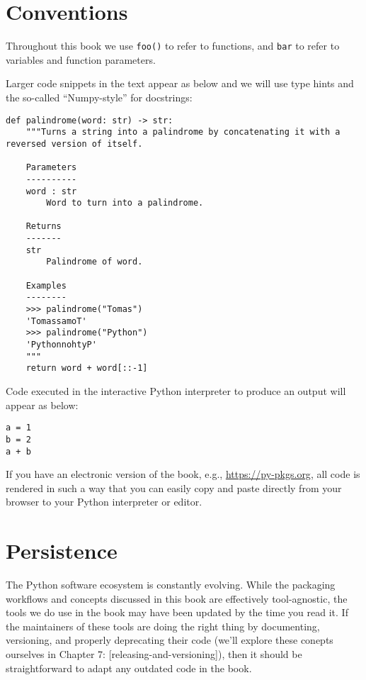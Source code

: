 \documentclass[
]{krantz}
\begin{document}
\hypertarget{conventions}{%
\section*{Conventions}\label{conventions}}


Throughout this book we use \texttt{foo()} to refer to functions, and \texttt{bar} to refer to variables and function parameters.

Larger code snippets in the text appear as below and we will use type hints and the so-called ``Numpy-style'' for docstrings:

\begin{verbatim}
def palindrome(word: str) -> str:
    """Turns a string into a palindrome by concatenating it with a reversed version of itself.
    
    Parameters
    ----------
    word : str
        Word to turn into a palindrome.
    
    Returns
    -------
    str
        Palindrome of word.
    
    Examples
    --------
    >>> palindrome("Tomas")
    'TomassamoT'
    >>> palindrome("Python")
    'PythonnohtyP'
    """
    return word + word[::-1]
\end{verbatim}

Code executed in the interactive Python interpreter to produce an output will appear as below:

\begin{verbatim}
a = 1
b = 2
a + b
\end{verbatim}

If you have an electronic version of the book, e.g., \url{https://py-pkgs.org}, all code is rendered in such a way that you can easily copy and paste directly from your browser to your Python interpreter or editor.

\hypertarget{persistence}{%
\section*{Persistence}\label{persistence}}


The Python software ecosystem is constantly evolving. While the packaging workflows and concepts discussed in this book are effectively tool-agnostic, the tools we do use in the book may have been updated by the time you read it. If the maintainers of these tools are doing the right thing by documenting, versioning, and properly deprecating their code (we'll explore these conepts ourselves in Chapter 7: {[}releasing-and-versioning{]}), then it should be straightforward to adapt any outdated code in the book.
\end{document}
